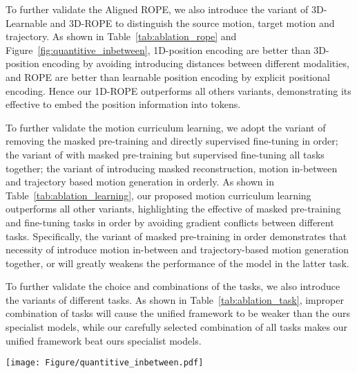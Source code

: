 To further validate the Aligned ROPE, we also introduce the variant of 3D-Learnable and 3D-ROPE to distinguish the source motion, target motion and trajectory. As shown in Table~\ref{tab:ablation_rope} and Figure~\ref{fig:quantitive_inbetween}, 1D-position encoding are better than 3D-position encoding by avoiding introducing distances between different modalities, and ROPE are better than learnable position encoding by explicit positional encoding. Hence our 1D-ROPE outperforms all others variants, demonstrating its effective to embed the position information into tokens.

To further validate the motion curriculum learning, we adopt the variant of removing the masked pre-training and directly supervised fine-tuning in order; the variant of with masked pre-training but supervised fine-tuning all tasks together; the variant of introducing masked reconstruction, motion in-between and trajectory based motion generation in orderly. As shown in Table~\ref{tab:ablation_learning}, our proposed motion curriculum learning outperforms all other variants, highlighting the effective of masked pre-training and fine-tuning tasks in order by avoiding gradient conflicts between different tasks. Specifically, the variant of masked pre-training in order demonstrates that necessity of introduce motion in-between and trajectory-based motion generation together, or will greatly weakens the performance of the model in the latter task.

To further validate the choice and combinations of the tasks, we also introduce the variants of different tasks. As shown in Table~\ref{tab:ablation_task}, improper combination of tasks will cause the unified framework to be weaker than the ours specialist models, while our carefully selected combination of all tasks makes our unified framework beat ours specialist models.

\begin{figure*}[!h]
  \centering
  \texttt{[image: Figure/quantitive\_inbetween.pdf]}
  \caption{Ablation results of MotionLab on the motion in-between (with text). Beige motion is use 1D-learnable position encoding, purple motion use Aligned ROPE, and gray motions are the poses provided in keyframes, demonstrating the importance of Aligned ROPE.}
  \label{fig:quantitive_inbetween}
\end{figure*} 



